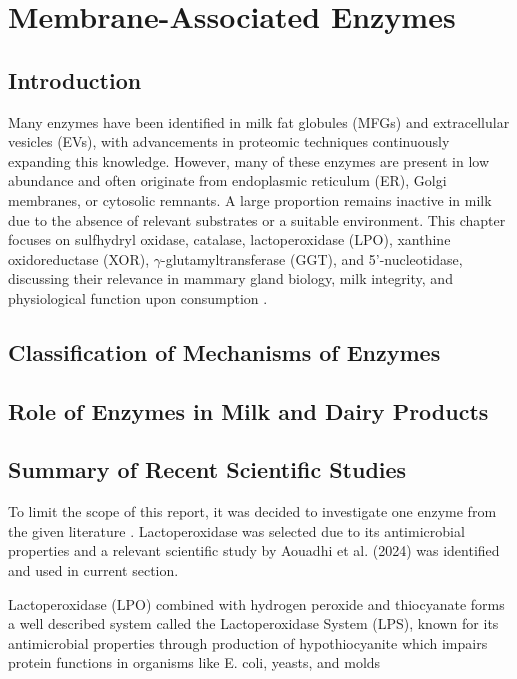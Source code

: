 \chapter{Membrane-Associated Enzymes}
\setlength{\headheight}{12.71342pt}
\addtolength{\topmargin}{-0.71342pt}

\section{Introduction}  
Many enzymes have been identified in milk fat globules (MFGs) and extracellular vesicles (EVs), with advancements in proteomic techniques continuously expanding this knowledge. However, many of these enzymes are present in low abundance and often originate from endoplasmic reticulum (ER), Golgi membranes, or cytosolic remnants. A large proportion remains inactive in milk due to the absence of relevant substrates or a suitable environment. This chapter focuses on sulfhydryl oxidase, catalase, lactoperoxidase (LPO), xanthine oxidoreductase (XOR), $\gamma$-glutamyltransferase (GGT), and 5'-nucleotidase, discussing their relevance in mammary gland biology, milk integrity, and physiological function upon consumption \cite*{RM_01}.  

\section{Classification of Mechanisms of Enzymes}


\section{Role of Enzymes in Milk and Dairy Products}

\section{Summary of Recent Scientific Studies}
To limit the scope of this report, it was decided to investigate one enzyme from the given literature \cite*{RM_01}. Lactoperoxidase was selected due to its antimicrobial properties and a relevant scientific study by Aouadhi et al. (2024) was identified and used in current section. 

\vline

Lactoperoxidase (LPO) combined with hydrogen peroxide and thiocyanate forms a well described system called the Lactoperoxidase System (LPS), known for its antimicrobial properties through production of hypothiocyanite which impairs protein functions in organisms like E. coli, yeasts, and molds \cite*{RM_02}

